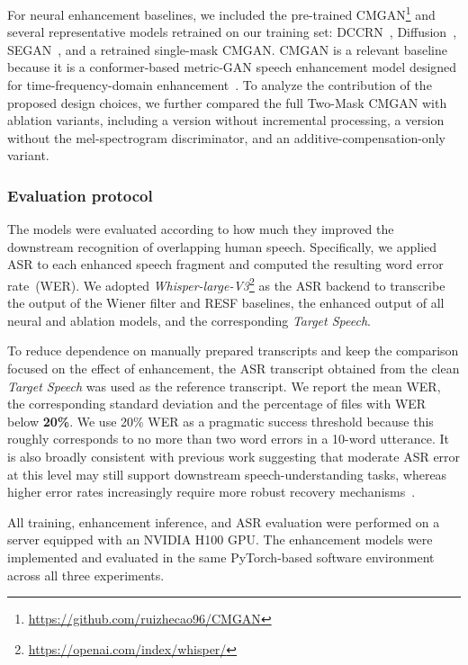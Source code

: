 \documentclass[manuscript,screen,review]{acmart}
\begin{document}
For neural enhancement baselines, we included the pre-trained CMGAN\footnote{\url{https://github.com/ruizhecao96/CMGAN}} and several representative models retrained on our training set: DCCRN~\cite{hu2020dccrn}, Diffusion~\cite{richter2023speech}, SEGAN~\cite{pascual2017segan}, and a retrained single-mask CMGAN. CMGAN is a relevant baseline because it is a conformer-based metric-GAN speech enhancement model designed for time-frequency-domain enhancement~\cite{cao2022cmgan}. To analyze the contribution of the proposed design choices, we further compared the full Two-Mask CMGAN with ablation variants, including a version without incremental processing, a version without the mel-spectrogram discriminator, and an additive-compensation-only variant.

\subsubsection{Evaluation protocol}
\label{sec:eval1_protocol}

The models were evaluated according to how much they improved the downstream recognition of overlapping human speech. Specifically, we applied ASR to each enhanced speech fragment and computed the resulting word error rate~(WER). We adopted \textit{Whisper-large-V3}\footnote{\url{https://openai.com/index/whisper/}} as the ASR backend to transcribe the output of the Wiener filter and RESF baselines, the enhanced output of all neural and ablation models, and the corresponding \textit{Target Speech}.

To reduce dependence on manually prepared transcripts and keep the comparison focused on the effect of enhancement, the ASR transcript obtained from the clean \textit{Target Speech} was used as the reference transcript. We report the mean WER, the corresponding standard deviation and the percentage of files with WER below \textbf{20\%}. We use 20\% WER as a pragmatic success threshold because this roughly corresponds to no more than two word errors in a 10-word utterance. It is also broadly consistent with previous work suggesting that moderate ASR error at this level may still support downstream speech-understanding tasks, whereas higher error rates increasingly require more robust recovery mechanisms~\cite{tejedor2022towards}.

All training, enhancement inference, and ASR evaluation were performed on a server equipped with an NVIDIA H100 GPU. The enhancement models were implemented and evaluated in the same PyTorch-based software environment across all three experiments. 
\end{document}
